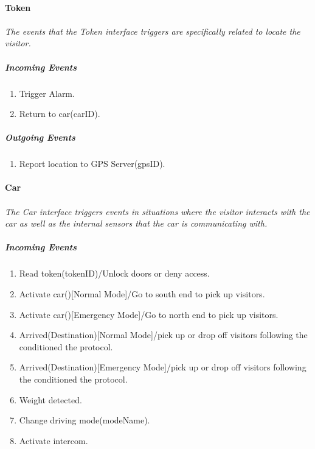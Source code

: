 \documentclass[12pt]{article}
\begin{document}
	\paragraph{Token}
	\paragraph {}\textit{The events that the Token interface triggers are specifically related to locate the visitor.  }
	    \subparagraph{Incoming Events}
		\begin{enumerate}
            \item Trigger Alarm. 
            \item Return to car(carID). 
		\end{enumerate}
				
	    \subparagraph{Outgoing Events}
		\begin{enumerate}
			\item Report location to GPS Server(gpsID).
		\end{enumerate}

	\paragraph{Car}
	\paragraph{} \textit{The Car interface triggers events in situations where the visitor interacts with the car as well as the internal sensors that the car is communicating with. }
	    \subparagraph{Incoming Events}
		\begin{enumerate}
            \item Read token(tokenID)/Unlock doors or deny access. 
            \item Activate car()[Normal Mode]/Go to south end to pick up visitors.
            \item Activate car()[Emergency Mode]/Go to north end to pick up visitors.
            \item Arrived(Destination)[Normal Mode]/pick up or drop off visitors following the conditioned the protocol.
            \item Arrived(Destination)[Emergency Mode]/pick up or drop off visitors following the conditioned the protocol.
            \item Weight detected.
            \item Change driving mode(modeName).
            \item Activate intercom.
		\end{enumerate}
				
\end{document}
